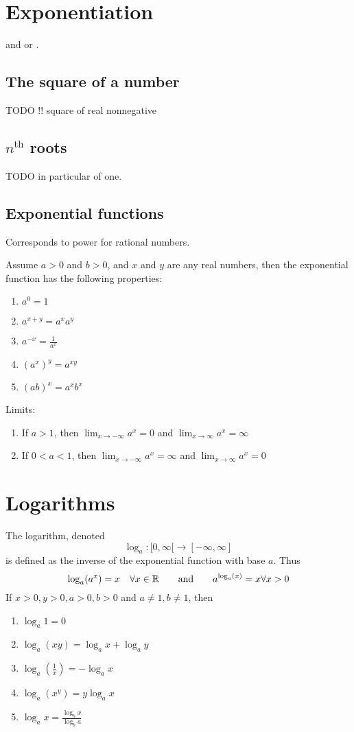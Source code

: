 \section{Exponentiation}
\begin{definition}
 and  or .
\end{definition}


\subsection{The square of a number}
TODO
!! square of real nonnegative

\subsection{$n^\text{th}$ roots}
TODO in particular of one.


\subsection{Exponential functions}
Corresponds to power for rational numbers.

Assume $a>0$ and $b>0$, and $x$ and $y$ are any real numbers, then the exponential function has the following properties:
\begin{enumerate}
\item $a^0 = 1$
\item $a^{x+y} = a^x a^y$
\item $a^{-x} = \frac{1}{a^x}$
\item $(a^x)^y = a^{xy}$
\item $(ab)^x = a^x b^x$
\end{enumerate}
Limits:
\begin{enumerate}
\item If $a>1$, then $\lim_{x\to -\infty} a^x = 0$ and $ \lim_{x\to \infty} a^x = \infty$
\item If $0 < a < 1$, then $\lim_{x\to -\infty} a^x = \infty$ and $ \lim_{x\to \infty} a^x = 0$
\end{enumerate}

\section{Logarithms}
The logarithm, denoted
\[ \log_a: [0,\infty[ \to [-\infty, \infty] \]
is defined as the inverse of the exponential function with base $a$. Thus
\[ \log_a(a^x) = x \quad \forall x\in\mathbb{R} \qquad \text{and} \qquad a^{\log_a(x)}=x \forall x>0 \]
If $x>0, y>0, a>0, b>0$ and $a \neq 1, b\neq 1$, then
\begin{enumerate}
\item $\log_a 1 = 0$
\item $\log_a(xy) = \log_a x + \log_a y$
\item $\log_a(\frac{1}{x}) = -\log_a x$
\item $\log_a(x^y) = y\log_a x$
\item $\log_a x = \frac{\log_b x}{\log_b a}$
\end{enumerate}


